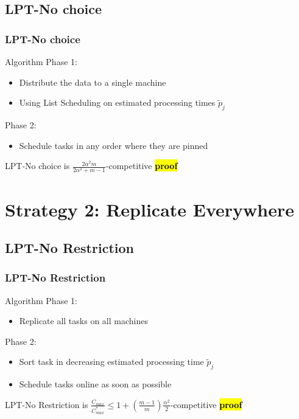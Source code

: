\documentclass[usenames,dvipsnames]{beamer}
\newcommand{\todo}[1]{{\color{red}\textbf{\hl{#1}}\xspace}}
\begin{document}
\subsection{LPT-No choice}

\begin{frame}
  \frametitle{LPT-No choice}

  \begin{block}{Algorithm}
    Phase 1:
    \begin{itemize}
    \item Distribute the data to a single machine
    \item Using List Scheduling on estimated processing times $\tilde{p}_j$
    \end{itemize}
    Phase 2:
    \begin{itemize}
    \item Schedule tasks in any order where they are pinned
    \end{itemize}
  \end{block}

  \begin{block}{LPT-No choice is $\frac{2\alpha^{2}m}{2\alpha^{2}+ m-1}$-competitive}
    \todo{proof}
  \end{block}
\end{frame}

\section{Strategy 2: Replicate Everywhere}

\subsection{LPT-No Restriction}

\begin{frame}
  \frametitle{LPT-No Restriction}

  \begin{block}{Algorithm}
    Phase 1:
    \begin{itemize}
    \item Replicate all tasks on all machines
    \end{itemize}
    Phase 2:
    \begin{itemize}
    \item Sort task in decreasing estimated processing time $\tilde{p}_j$
    \item Schedule tasks online as soon as possible
    \end{itemize}
  \end{block}
  
  \begin{block}{LPT-No Restriction is $\frac{C_{max}}{C_{max}^{*}} \leq 1 + (\frac{m-1}{m}) \frac{\alpha^{2}}{2}$-competitive}
    \todo{proof}
  \end{block}  
\end{frame}
\end{document}
